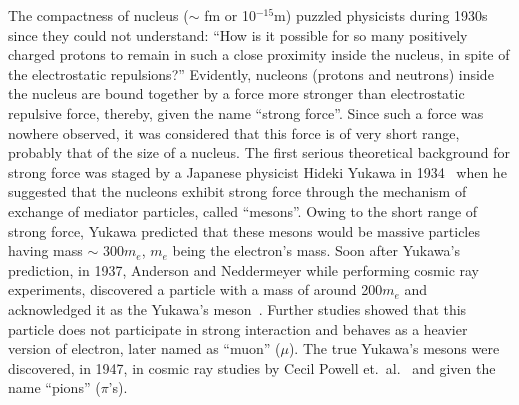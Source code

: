 The compactness of nucleus ($\sim$ fm or 10$^{-15}$m) puzzled physicists during 1930s since they could not understand: ``How is it possible for so many positively
charged protons to remain in such a close proximity inside the nucleus, in spite of the electrostatic repulsions?'' Evidently, nucleons (protons and
neutrons) inside the nucleus are bound together by a force more stronger than electrostatic repulsive force, thereby, given the name ``strong force''.   
Since such a force was nowhere observed, it was considered that this force is of very short range, probably that of the size of a nucleus. The first serious theoretical
background for strong force was staged by a Japanese physicist Hideki Yukawa in 1934~\cite{Yukawa:1935xg} when he suggested that the nucleons exhibit strong force through
the mechanism of exchange of mediator particles, called ``mesons''. Owing to the short range of strong force, Yukawa predicted that these mesons
would be massive particles having mass $\sim$ 300$m_{e}$, $m_{e}$ being the electron's mass.
Soon after Yukawa's prediction, in 1937, Anderson and Neddermeyer while performing cosmic ray experiments,
discovered a particle with a mass of around 200$m_{e}$ and acknowledged it as the Yukawa's meson~\cite{Neddermeyer:1937md}.
Further studies showed that this particle does not participate in
strong interaction and behaves as a heavier version of electron, later named as ``muon'' ($\mu$). The true Yukawa's mesons
were discovered, in 1947, in cosmic ray studies by Cecil Powell et.\ al.~\cite{Lattes:1947mx} and given the name ``pions'' ($\pi$'s). 

